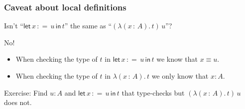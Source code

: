 \documentclass[11pt,aspectratio=169]{beamer}
\newcommand{\of}{\,{:}\,} %
\newcommand{\lam}[1]{\lambda (#1).\,}
\newcommand{\letin}[3]{\mathsf{let}\,#1\,{{:}{=}}\,#2\,\mathsf{in}\,#3}
\begin{document}
\begin{frame}
  \frametitle{Caveat about local definitions}


  \begin{center}
    \Large
    Isn't ``$\letin{x}{u}{t}$'' the same as ``$(\lam{x \of A} t) \, u$''?
  \end{center}

  \pause

  \bigskip

  No!
  \begin{itemize}
  \item When checking the type of $t$ in $\letin{x}{u}{t}$ we know that $x \equiv u$.
  \item When checking the type of $t$ in $\lam{x \of A} t$ we only know that $x : A$.
  \end{itemize}
  \pause
  Exercise: Find $u : A$ and $\letin{x}{u}{t}$ that type-checks but $(\lam{x \of A} t) \, u$ does not.


\end{frame}
\end{document}
